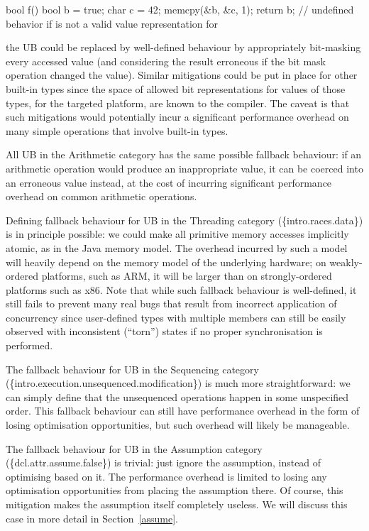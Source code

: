 \begin{codeblock}
bool f() {
  bool b = true;
  char c = 42;
  memcpy(&b, &c, 1);
  return b;         // undefined behavior if  is not a valid value representation for 
}
\end{codeblock}

the UB could be replaced by well-defined behaviour by appropriately bit-masking every accessed  value (and considering the result erroneous if the bit mask operation changed the value). Similar mitigations could be put in place for other built-in types since the space of allowed bit representations for values of those types, for the targeted platform, are known to the compiler. The caveat is that such mitigations would potentially incur a significant performance overhead on many simple operations that involve built-in types.

All UB in the Arithmetic category has the same possible fallback behaviour: if an arithmetic operation would produce an inappropriate value, it can be coerced into an erroneous value instead, at the cost of incurring significant performance overhead on common arithmetic operations.

Defining fallback behaviour for UB in the Threading category (\{intro.races.data\}) is in principle possible: we could make all primitive memory accesses implicitly atomic, as in the Java memory model. The overhead incurred by such a model will heavily depend on the memory model of the underlying hardware; on weakly-ordered platforms, such as ARM,
it will be larger than on strongly-ordered platforms such as x86. Note that while such fallback behaviour is well-defined, it still fails to prevent many real bugs that result from incorrect application of concurrency since user-defined types with multiple members can still be easily observed with inconsistent (``torn'') states if no proper synchronisation is performed.

The fallback behaviour for UB in the Sequencing category (\{intro.execution.unsequenced.modifica\-tion\})
is much more straightforward: we can simply define that the unsequenced operations happen in some unspecified order. This fallback behaviour can still have performance overhead in the form of losing  optimisation opportunities, but such overhead will likely be manageable. 

The fallback behaviour for UB in the Assumption category (\{dcl.attr.assume.false\}) is trivial: just ignore the assumption, instead of optimising based on it. The performance overhead is limited to losing any optimisation opportunities from placing the assumption there. Of course, this mitigation makes the assumption itself completely useless. We will discuss this case in more detail in Section~\ref{assume}.

